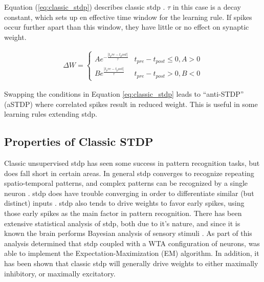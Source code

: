     Equation (\ref{eq:classic_stdp}) describes classic \Gls{stdp}
    \parencite{tavanaei_2019}. $\tau$ in this case is a decay constant, which
    sets up en effective time window for the learning rule. If spikes occur
    further apart than this window, they have little or no effect on synaptic
    weight.

    \begin{align}
        \Delta W =
        \begin{cases}
          Ae^{-\frac{|t_pre-t_post|}{\tau}} & t_{pre} - t_{post} \leq 0, A > 0
          \\ Be^{\frac{|t_pre-t_post|}{\tau}} & t_{pre} - t_{post} > 0, B < 0
       \end{cases} \label{eq:classic_stdp}
    \end{align}

    Swapping the conditions in Equation \ref{eq:classic_stdp} leads to
    ``anti-STDP'' (aSTDP) where correlated spikes result in reduced weight. This
    is useful in some learning rules extending \Gls{stdp}.

    \subsection{Properties of Classic STDP}
    Classic unsupervised \Gls{stdp} has seen some success in pattern recognition
    tasks, but does fall short in certain areas. In general \Gls{stdp} converges to
    recognize repeating spatio-temporal patterns, and complex patterns can be
    recognized by a single neuron \parencite{tavanaei_2019}. \Gls{stdp} does have trouble
    converging in order to differentiate similar (but distinct) inputs
    \parencite{vigneron_2020}. \Gls{stdp} also tends to drive weights to favor early
    spikes, using those early spikes as the main factor in pattern
    recognition. There has been extensive statistical analysis of \Gls{stdp}, both due
    to it's nature, and since it is known the brain performs Bayesian
    analysis of sensory stimuli \parencite{tavanaei_2019}. As part of this analysis
    \parencite{nessler_2009}  determined that \Gls{stdp} coupled with a WTA
    configuration of neurons, was able to implement the Expectation-Maximization (EM)
    algorithm. In addition, it has been shown that classic \Gls{stdp} will generally
    drive weights to either maximally inhibitory, or maximally
    excitatory.



